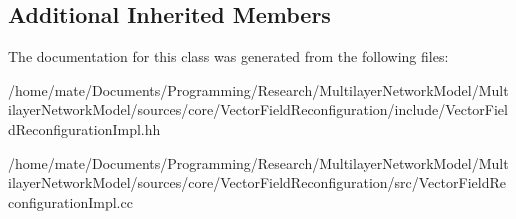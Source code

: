 \subsection*{Additional Inherited Members}


The documentation for this class was generated from the following files\+:\begin{DoxyCompactItemize}
\item 
/home/mate/\+Documents/\+Programming/\+Research/\+Multilayer\+Network\+Model/\+Multilayer\+Network\+Model/sources/core/\+Vector\+Field\+Reconfiguration/include/Vector\+Field\+Reconfiguration\+Impl.\+hh\item 
/home/mate/\+Documents/\+Programming/\+Research/\+Multilayer\+Network\+Model/\+Multilayer\+Network\+Model/sources/core/\+Vector\+Field\+Reconfiguration/src/Vector\+Field\+Reconfiguration\+Impl.\+cc\end{DoxyCompactItemize}
